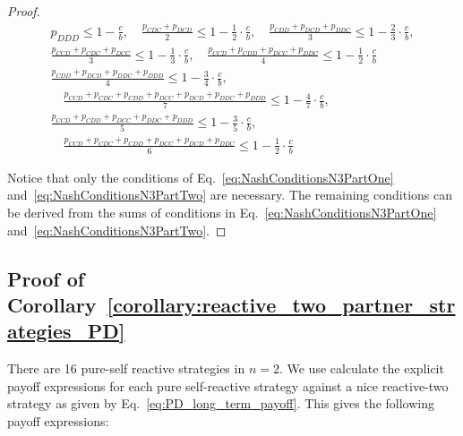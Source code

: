 \documentclass{article}
\theoremstyle{definition}
\begin{document}
\begin{proof}
\begin{align}
  p_{DDD} \leq 1 \!- \!\frac{c}{b},
  \quad \frac{p_{CDC} + p_{DCD}}{2} \leq 1 - \frac{1}{2} \cdot \frac{c}{b}, 
  \quad \frac{p_{CDD} + p_{DCD} + p_{DDC}}{3} \leq 1 - \frac{2}{3} \cdot \frac{c}{b}, \label{eq:NashConditionsN3PartOne} \\[.5em]
  \frac{p_{CCD} + p_{CDC} + p_{DCC}}{3} \leq 1 - \frac{1}{3} \cdot \frac{c}{b},
  \quad \frac{p_{CCD} + p_{CDD} + p_{DCC} + p_{DDC}}{4} \leq 1 - \frac{1}{2}  \cdot \frac{c}{b} \label{eq:NashConditionsN3PartTwo} \\[.5em]
  \frac{p_{CDD} + p_{DCD} + p_{DDC} + p_{DDD}}{4} \leq 1 - \frac{3}{4} \cdot \frac{c}{b}, \\[.5em]
  \quad \frac{p_{CCD} + p_{CDC} + p_{CDD} + p_{DCC} + p_{DCD} + p_{DDC} + p_{DDD}}{7} \leq 1 - \frac{4}{7} \cdot \frac{c}{b}, \\[.5em]
  \frac{p_{CCD} + p_{CDD} + p_{DCC} + p_{DDC} + p_{DDD}}{5} \leq 1 - \frac{3}{5} \cdot \frac{c}{b}, \\[.5em]
  \quad \frac{p_{CCD} + p_{CDC} + p_{CDD} + p_{DCC} + p_{DCD} + p_{DDC}}{6} \leq 1 - \frac{1}{2} \cdot \frac{c}{b}
\end{align}

Notice that only the conditions of Eq.~\eqref{eq:NashConditionsN3PartOne}
and~\eqref{eq:NashConditionsN3PartTwo} are necessary. The remaining conditions can
be derived from the sums of conditions in Eq.~\eqref{eq:NashConditionsN3PartOne}
and~\eqref{eq:NashConditionsN3PartTwo}.
\end{proof}


\subsection{Proof of Corollary~\ref{corollary:reactive_two_partner_strategies_PD}}\label{appendix:reactive_two_pure_self_reactive_pd}

There are 16 pure-self reactive strategies in $n=2$. We use calculate the
explicit payoff expressions for each pure self-reactive strategy against a nice
reactive-two strategy as given by Eq.~\eqref{eq:PD_long_term_payoff}.
This gives the following payoff expressions:
\end{document}
